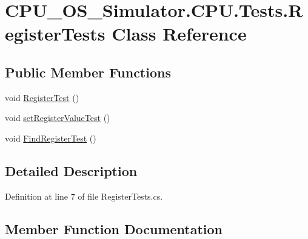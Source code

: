 \hypertarget{class_c_p_u___o_s___simulator_1_1_c_p_u_1_1_tests_1_1_register_tests}{}\section{C\+P\+U\+\_\+\+O\+S\+\_\+\+Simulator.\+C\+P\+U.\+Tests.\+Register\+Tests Class Reference}
\label{class_c_p_u___o_s___simulator_1_1_c_p_u_1_1_tests_1_1_register_tests}
\subsection*{Public Member Functions}
\begin{DoxyCompactItemize}
\item 
void \hyperlink{class_c_p_u___o_s___simulator_1_1_c_p_u_1_1_tests_1_1_register_tests_a1fdf6a35fde71647f9b85c74d9893476}{Register\+Test} ()
\item 
void \hyperlink{class_c_p_u___o_s___simulator_1_1_c_p_u_1_1_tests_1_1_register_tests_a50a7835c27a463a0a36ae36ecf139271}{set\+Register\+Value\+Test} ()
\item 
void \hyperlink{class_c_p_u___o_s___simulator_1_1_c_p_u_1_1_tests_1_1_register_tests_ac5bd928d3c3538b8b4bf5b75e6ec7867}{Find\+Register\+Test} ()
\end{DoxyCompactItemize}


\subsection{Detailed Description}


Definition at line 7 of file Register\+Tests.\+cs.



\subsection{Member Function Documentation}
\hypertarget{class_c_p_u___o_s___simulator_1_1_c_p_u_1_1_tests_1_1_register_tests_ac5bd928d3c3538b8b4bf5b75e6ec7867}{}
